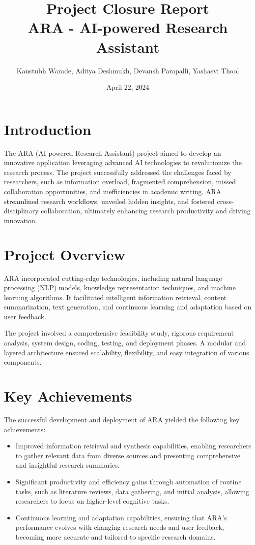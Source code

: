 \documentclass[a4paper]{article}
\title{Project Closure Report\\ARA - AI-powered Research Assistant}
\author{Kaustubh Warade, Aditya Deshmukh, Devansh Parapalli, Yashasvi Thool}
\date{April 22, 2024}
\begin{document}
\maketitle

\section{Introduction}
The ARA (AI-powered Research Assistant) project aimed to develop an innovative application leveraging advanced AI technologies to revolutionize the research process. The project successfully addressed the challenges faced by researchers, such as information overload, fragmented comprehension, missed collaboration opportunities, and inefficiencies in academic writing. ARA streamlined research workflows, unveiled hidden insights, and fostered cross-disciplinary collaboration, ultimately enhancing research productivity and driving innovation.

\section{Project Overview}
ARA incorporated cutting-edge technologies, including natural language processing (NLP) models, knowledge representation techniques, and machine learning algorithms. It facilitated intelligent information retrieval, content summarization, text generation, and continuous learning and adaptation based on user feedback.

The project involved a comprehensive feasibility study, rigorous requirement analysis, system design, coding, testing, and deployment phases. A modular and layered architecture ensured scalability, flexibility, and easy integration of various components.

\section{Key Achievements}
The successful development and deployment of ARA yielded the following key achievements:

\begin{itemize}
   \item Improved information retrieval and synthesis capabilities, enabling researchers to gather relevant data from diverse sources and presenting comprehensive and insightful research summaries.
   \item Significant productivity and efficiency gains through automation of routine tasks, such as literature reviews, data gathering, and initial analysis, allowing researchers to focus on higher-level cognitive tasks.
   \item Continuous learning and adaptation capabilities, ensuring that ARA's performance evolves with changing research needs and user feedback, becoming more accurate and tailored to specific research domains.
\end{itemize}
\end{document}
